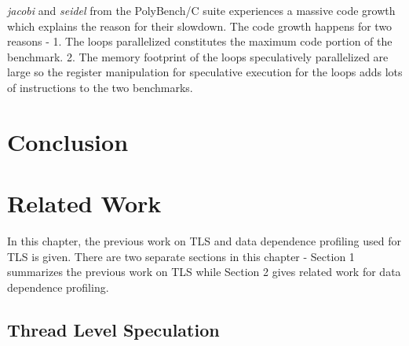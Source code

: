 \documentclass[10pt]{report}          %
\begin{document}
\textit{jacobi} and \textit{seidel} from the PolyBench/C suite experiences a massive code growth which explains the reason for their slowdown.  The code growth happens for two reasons - 1. The loops parallelized constitutes the maximum code portion of the benchmark. 2. The memory footprint of the loops speculatively parallelized are large so the register manipulation for speculative execution for the loops adds lots of instructions to the two benchmarks.

\chapter{Conclusion}
\chapter{Related Work}

In this chapter, the previous work on TLS and data dependence profiling used for TLS is given.  There are two separate sections in this chapter - Section 1 summarizes the previous work on TLS while Section 2 gives related work for data dependence profiling.

\section{Thread Level Speculation}
\end{document}
